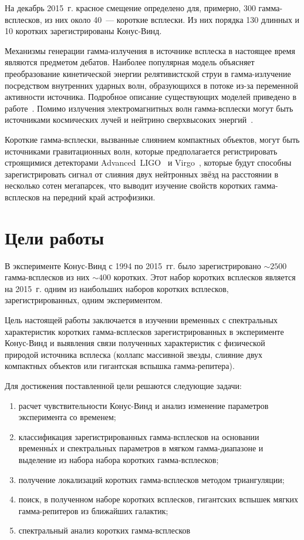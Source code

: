 На декабрь 2015~г. красное смещение определено для, примерно, 300 гамма-всплесков, 
из них около 40~--- короткие всплески. Из них порядка 130 длинных и 10 коротких 
зарегистрированы Конус-Винд.

Механизмы генерации гамма-излучения в источнике всплеска в настоящее время 
являются предметом дебатов. Наиболее популярная модель объясняет преобразование 
кинетической энергии релятивистской струи в гамма-излучение посредством внутренних
ударных волн, образующихся в потоке из-за переменной активности источника.
Подробное описание существующих моделей приведено в работе~\citep{Kumar_and_Zhang_2014PhR}.
Помимо излучения электромагнитных волн гамма-всплески могут быть источниками
космических лучей и нейтрино сверхвысоких энергий~\citep{Aartsen_2015ApJ,Baerwald_2015APh}.

Короткие гамма-всплески, вызванные слиянием компактных объектов, могут быть источниками гравитационных волн, 
которые предполагается регистрировать строящимися детекторами Advanced~LIGO~\citep{Harry_2010CQGra} 
и Virgo~\citep{Accadia_2012JInst}, которые будут способны зарегистрировать сигнал от слияния
двух нейтронных звёзд на расстоянии в несколько сотен мегапарсек,
что выводит изучение свойств коротких гамма-всплесков на передний край астрофизики.

\section*{Цели работы}
В эксперименте Конус-Винд с 1994 по 2015~гг. было зарегистрировано 
$\sim 2500$ гамма-всплесков из них $\sim 400$ коротких. Этот набор коротких всплесков 
является на 2015~г. одним из наибольших наборов коротких всплесков, зарегистрированных, 
одним экспериментом.

Цель настоящей работы заключается в изучении временных с спектральных характеристик 
коротких гамма-всплесков зарегистрированных в эксперименте Конус-Винд и выявления 
связи полученных характеристик с физической природой источника всплеска 
(коллапс массивной звезды, слияние двух компактных объектов или гигантская вспышка гамма-репитера).

Для достижения поставленной цели решаются следующие задачи:
\begin{enumerate}
\item расчет чувствительности Конус-Винд и анализ изменение параметров эксперимента со временем;
\item классификация зарегистрированных гамма-всплесков на основании временн\'{ы}х 
и спектральных параметров в мягком гамма-диапазоне и выделение из набора набора коротких гамма-всплесков; 
\item получение локализаций коротких гамма-всплесков методом триангуляции; 
\item поиск, в полученном наборе коротких всплесков, гигантских 
вспышек мягких гамма-репитеров из ближайших галактик;
\item спектральный анализ коротких гамма-всплесков
\end{enumerate}

